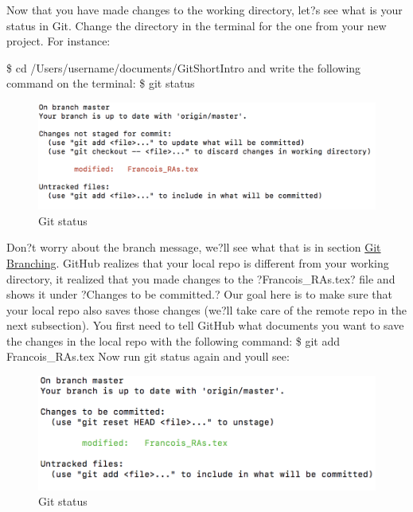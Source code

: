 \documentclass[12pt]{article}
\begin{document}
    Now that you have made changes to the working directory, let?s see what is your status in Git. Change the directory in the terminal for the one from your new project. For instance:
    
    \vspace{0.1 in}
    \indent \$ cd /Users/username/documents/GitShortIntro
    \newline
    \newline
    and write the following command on the terminal:
    \newline
    \newline
    \indent \$ git status
    \begin{figure}[h]
	\caption{Git status}
	\includegraphics[scale=0.5]{figure2}
	\centering
    \end{figure}
    \vspace{0.1 in}
    Don?t worry about the branch message, we?ll see what that is in section \hyperref[sec:branching]{Git Branching}. GitHub realizes that your local repo is different from your working directory, it realized that you made changes to the ?Francois\_RAs.tex? file and shows it under ?Changes to be committed.? Our goal here is to make sure that your local repo also saves those changes (we?ll take care of the remote repo in the next subsection). You first need to tell GitHub what documents you want to save the changes in the local repo with the following command:
    \newline
    \newline
    \indent \$ git add Francois\_RAs.tex
    \newline
    \newline
    Now run git status again and you\textquotesingle ll see:
    \newline
    \begin{figure}[h]
	\caption{Git status}
	\includegraphics[scale=0.5]{figure3}
	\centering
    \end{figure}
    \vspace{0.1 in}
\end{document}
